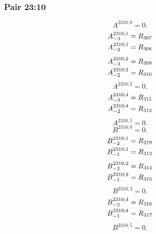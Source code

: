 \documentclass[11pt,a4paper]{article}
\begin{document}
\subsubsection{Pair 23:10}
\begin{equation}
A^{2310;0}=0.
\label{eq:cat-map-414}
\end{equation}
\begin{equation}
\shortstack[l]{$\displaystyle A^{2310;1}_{-3}=R_{307}$\\
$\displaystyle A^{2310;1}_{-2}=R_{308}$}
\label{eq:cat-map-415}
\end{equation}
\begin{equation}
\shortstack[l]{$\displaystyle A^{2310;2}_{-3}=R_{309}$\\
$\displaystyle A^{2310;2}_{-2}=R_{310}$}
\label{eq:cat-map-416}
\end{equation}
\begin{equation}
A^{2310;3}=0.
\label{eq:cat-map-417}
\end{equation}
\begin{equation}
\shortstack[l]{$\displaystyle A^{2310;4}_{-3}=R_{311}$\\
$\displaystyle A^{2310;4}_{-2}=R_{312}$}
\label{eq:cat-map-418}
\end{equation}
\begin{equation}
A^{2310;5}=0.
\label{eq:cat-map-419}
\end{equation}
\begin{equation}
B^{2310;0}=0.
\label{eq:cat-map-420}
\end{equation}
\begin{equation}
\shortstack[l]{$\displaystyle B^{2310;1}_{-2}=R_{219}$\\
$\displaystyle B^{2310;1}_{-1}=R_{313}$}
\label{eq:cat-map-421}
\end{equation}
\begin{equation}
\shortstack[l]{$\displaystyle B^{2310;2}_{-2}=R_{314}$\\
$\displaystyle B^{2310;2}_{-1}=R_{315}$}
\label{eq:cat-map-422}
\end{equation}
\begin{equation}
B^{2310;3}=0.
\label{eq:cat-map-423}
\end{equation}
\begin{equation}
\shortstack[l]{$\displaystyle B^{2310;4}_{-2}=R_{316}$\\
$\displaystyle B^{2310;4}_{-1}=R_{317}$}
\label{eq:cat-map-424}
\end{equation}
\begin{equation}
B^{2310;5}=0.
\label{eq:cat-map-425}
\end{equation}
\end{document}
